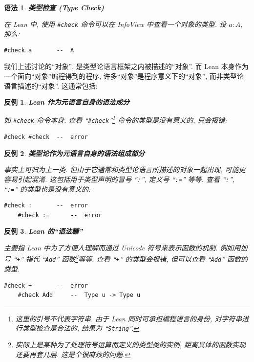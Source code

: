 \documentclass[UTF8]{ctexart}
\DeclareMathOperator{\0}{\mathbf{0}}                    %
\newcommand{\<}{\langle}
\renewcommand{\>}{\rangle}                              %
\newenvironment{thm_box}{
    \begin{tcolorbox}[enhanced, colback=thm_blue2, boxrule=0pt, frame hidden,
        borderline west={0.7mm}{0.1mm}{thm_blue1},breakable]
    }
    {\end{tcolorbox}}
\newenvironment{cxmp_box}{
    \begin{tcolorbox}[enhanced, colback=cxmp_red2, boxrule=0pt, frame hidden,
        borderline west={0.7mm}{0.1mm}{cxmp_red1},breakable]
    }
    {\end{tcolorbox}}
\theoremstyle{MyStyle} %
\newtheorem{syntax}[definition]{语法}
\newenvironment{syn}[1]
{
    \begin{thm_box}
        \begin{syntax}
            \textbf{#1}
            \newline
}
{
        \end{syntax}
    \end{thm_box}
}
\newtheorem{cexample}{反例}[subsection]
\newenvironment{cxmp}[1]
{
    \begin{cxmp_box}
        \begin{cexample}
            \textbf{#1}
            \newline
}
{
        \end{cexample}
    \end{cxmp_box}
}
\newcommand*{\lean}[1]{\texttt{\color{blue}#1}}
\begin{document}
        \begin{syn}
            {类型检查 (Type Check)}
            在 Lean 中, 使用 \lean{\#check} 命令可以在 InfoView 中查看一个对象的类型. 设 $a : A$, 那么: 
            \begin{lstlisting}[style=lean]
    #check a       --  A
            \end{lstlisting}
        \end{syn}

        我们上述讨论的``对象'', 是类型论语言框架之内被描述的``对象''. 而 Lean 本身作为一个面向``对象''编程得到的程序, 许多``对象''是程序意义下的``对象'', 而非类型论语言描述的``对象''. 这通常包括: 

        \begin{cxmp}
            {Lean 作为元语言自身的语法成分}
            如 \lean{\#check} 命令本身. 查看 ``\lean{\#check}''\footnote{这里的引号不代表字符串. 由于 Lean 同时可承担编程语言的身份, 对字符串进行类型检查是合法的, 结果为 ``\texttt{String}''. } 命令的类型是没有意义的, 只会报错: 
            \begin{lstlisting}[style=lean]
    #check #check  --  error
            \end{lstlisting}
        \end{cxmp}

        \begin{cxmp}
            {类型论作为元语言自身的语法组成部分}
            事实上可归为上一类. 但由于它通常和类型论语言所描述的对象一起出现, 可能更容易引起混淆. 这包括用于类型声明的冒号 ``\texttt{:}'', 定义号 ``\texttt{:=}'' 等等. 查看 ``\texttt{:}'', ``\texttt{:=}'' 的类型也是没有意义的: 
            \begin{lstlisting}[style=lean]
    #check :       --  error
    #check :=      --  error
            \end{lstlisting}
        \end{cxmp}

        \begin{cxmp}
            {Lean 的``语法糖''}
            主要指 Lean 中为了方便人理解而通过 Unicode 符号来表示函数的机制. 例如用加号 ``\texttt{+}'' 指代 ``\texttt{Add}'' 函数\footnote{实际上是某种为了处理符号运算而定义的类型类的实例, 距离具体的函数实现还要再套几层. 这是个很麻烦的问题. }等等. 查看 ``\texttt{+}'' 的类型会报错, 但可以查看 ``\texttt{Add}'' 函数的类型. 
            \begin{lstlisting}[style=lean]
    #check +       --  error
    #check Add     --  Type u -> Type u
            \end{lstlisting}
        \end{cxmp}
\end{document}
